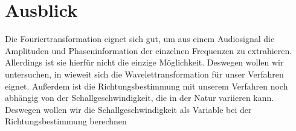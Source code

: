 \section{Ausblick} %
Die Fouriertransformation eignet sich gut, um aus einem Audiosignal die Amplituden und Phaseninformation der einzelnen Frequenzen zu extrahieren. Allerdings ist sie hierfür nicht die einzige Möglichkeit. Deswegen wollen wir untersuchen, in wieweit sich die Wavelettransformation für unser Verfahren eignet. Außerdem ist die Richtungsbestimmung mit unserem Verfahren noch abhängig von der Schallgeschwindigkeit, die in der Natur variieren kann. Deswegen wollen wir die Schallgeschwindigkeit als Variable bei der Richtungsbestimmung berechnen
